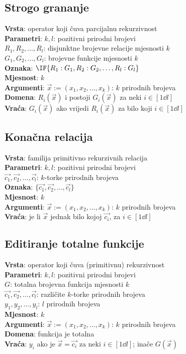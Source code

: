 \subsection{Strogo grananje}
\textbf{Vrsta}: operator koji čuva parcijalnu rekurzivnost\\
\textbf{Parametri}: $k,l$: pozitivni prirodni brojevi\\
$R_1,R_2,\dots,R_l$: disjunktne brojevne relacije mjesnosti $k$\\
$G_1,G_2,\dots,G_l$: brojevne funkcije mjesnosti $k$\\
\textbf{Oznaka}: $\IF{R_1:G_1,R_2:G_2,\dots,R_l:G_l}$\\
\textbf{Mjesnost}: $k$\\
\textbf{Argumenti}: $\vec x:=(x_1,x_2,\dots,x_k)$: $k$ prirodnih brojeva\\
\textbf{Domena}: $R_i(\vec x)$ i postoji $G_i(\vec x)$ za neki $i\in[1\dd l]$\\
\textbf{Vraća}: $G_i(\vec x)$ ako vrijedi $R_i(\vec x)$ za bilo koji $i\in[1\dd l]$

\subsection{Konačna relacija}
\textbf{Vrsta}: familija primitivno rekurzivnih relacija\\
\textbf{Parametri}: $k,l$: pozitivni prirodni brojevi\\
$\vec{c_1},\vec{c_2},\dots,\vec{c_l}$: $k$-torke prirodnih brojeva\\
\textbf{Oznaka}: $\{\vec{c_1},\vec{c_2},\dots,\vec{c_l}\}$\\
\textbf{Mjesnost}: $k$\\
\textbf{Argumenti}: $\vec x:=(x_1,x_2,\dots,x_k)$: $k$ prirodnih brojeva\\
\textbf{Vraća}: je li $\vec x$ jednak bilo kojoj $\vec{c_i}$, za $i\in[1\dd l]$

\subsection{Editiranje totalne funkcije}
\textbf{Vrsta}: operator koji čuva (primitivnu) rekurzivnost\\
\textbf{Parametri}: $k,l$: pozitivni prirodni brojevi\\
$G$: totalna brojevna funkcija mjesnosti $k$\\
$\vec{c_1},\vec{c_2},\dots,\vec{c_l}$: različite $k$-torke prirodnih brojeva\\
$y_1,y_2,\dots,y_l$: $l$ prirodnih brojeva\\
\textbf{Mjesnost}: $k$\\
\textbf{Argumenti}: $\vec x:=(x_1,x_2,\dots,x_k)$: $k$ prirodnih brojeva\\
\textbf{Domena}: funkcija je totalna\\
\textbf{Vraća}: $y_i$ ako je $\vec x=\vec{c_i}$ za neki $i\in[1\dd l]$; inače $G(\vec x)$


